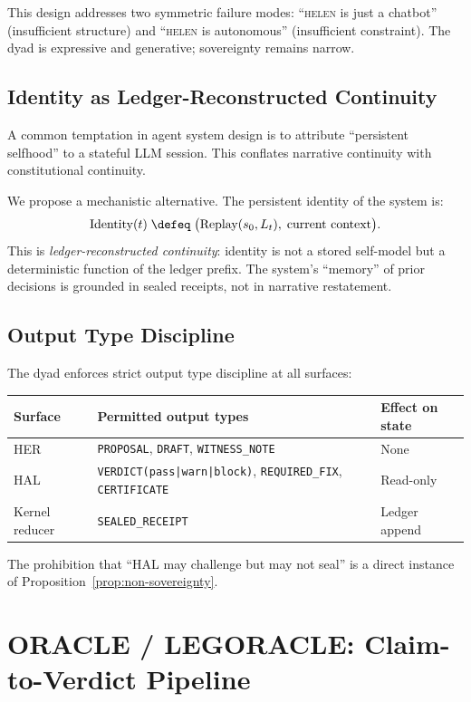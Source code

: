 \documentclass[11pt,a4paper]{article}
\theoremstyle{plain}
\theoremstyle{definition}
\theoremstyle{remark}
\newcommand{\Replay}{\mathrm{Replay}}
\begin{document}
This design addresses two symmetric failure modes:
``\textsc{helen} is just a chatbot'' (insufficient structure) and
``\textsc{helen} is autonomous'' (insufficient constraint).
The dyad is expressive and generative; sovereignty remains narrow.

\subsection{Identity as Ledger-Reconstructed Continuity}

A common temptation in agent system design is to attribute
``persistent selfhood'' to a stateful LLM session.
This conflates narrative continuity with constitutional continuity.

We propose a mechanistic alternative.
The persistent identity of the system is:
\[
  \mathrm{Identity}(t) \;\defeq\;
  \bigl(\Replay(s_0, L_t),\;\text{current context}\bigr).
\]
This is \emph{ledger-reconstructed continuity}:
identity is not a stored self-model but a deterministic function of the
ledger prefix.
The system's ``memory'' of prior decisions is grounded in sealed receipts,
not in narrative restatement.

\subsection{Output Type Discipline}

The dyad enforces strict output type discipline at all surfaces:

\begin{center}
\begin{tabular}{lll}
\toprule
Surface & Permitted output types & Effect on state \\
\midrule
HER & \texttt{PROPOSAL}, \texttt{DRAFT}, \texttt{WITNESS\_NOTE} & None \\
HAL & \texttt{VERDICT(pass|warn|block)}, \texttt{REQUIRED\_FIX}, \texttt{CERTIFICATE} & Read-only \\
Kernel reducer & \texttt{SEALED\_RECEIPT} & Ledger append \\
\bottomrule
\end{tabular}
\end{center}

The prohibition that ``HAL may challenge but may not seal''
is a direct instance of Proposition~\ref{prop:non-sovereignty}.

\section{ORACLE / LEGORACLE: Claim-to-Verdict Pipeline}
\label{sec:oracle}
\end{document}
